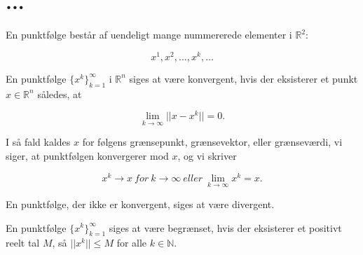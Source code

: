 \chapter*{...}

\begin{definition}[Punktfølge]
En punktfølge består af uendeligt mange nummererede elementer i $\mathbb{R}^2$:

\begin{equation}
    x^1, x^2, \hdots, x^k, \hdots
\end{equation}
\end{definition}

\begin{definition}
En punktfølge $\{x^k\}^\infty_{k=1}$ i $\mathbb{R}^n$ siges at være konvergent, hvis der eksisterer et punkt $x \in \mathbb{R}^n$ således, at 

\begin{equation}
    \lim_{k \to \infty} ||x-x^k|| = 0.
\end{equation}

I så fald kaldes $x$ for følgens grænsepunkt, grænsevektor, eller grænseværdi, vi siger, at punktfølgen konvergerer mod $x$, og vi skriver

\begin{equation}
    x^k \to x \ for \ k \to \infty \ eller \ \lim_{k \to \infty} x^k = x. 
\end{equation}

En punktfølge, der ikke er konvergent, siges at være divergent. 

\end{definition}

\begin{definition}[]
En punktfølge $\{x^k\}^\infty_{k=1}$ siges at være begrænset, hvis der eksisterer et positivt reelt tal $M$, så $||x^k|| \leq M$ for alle $k\in \mathbb{N}$. 
\end{definition}

